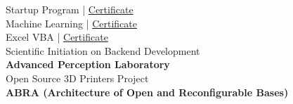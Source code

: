 
Startup Program \hfill| {\color{linkBlue} \href{https://e-certificado.com/login/visualizar?c=664024A5B7D718B4639950}{Certificate}}
\vspace{0.1em}\\
Machine Learning \hfill|  {\color{linkBlue} \href{https://cursos.alura.com.br/degree/certificate/98f57b77-ffe3-4062-b69c-7259b0fd74c6}{Certificate}}
\vspace{0.1em}\\
Excel VBA \hfill| {\color{linkBlue} \href{https://cursos.alura.com.br/degree/certificate/68d6f5b3-3a07-4fac-9f6b-f42f04e131ca}{Certificate}}
\vspace{0.7em}\\
Scientific Initiation on Backend Development\\\textbf{Advanced Perception Laboratory}
\vspace{0.7em}\\
Open Source 3D Printers Project\\\textbf{ABRA (Architecture of Open and Reconfigurable Bases)}
